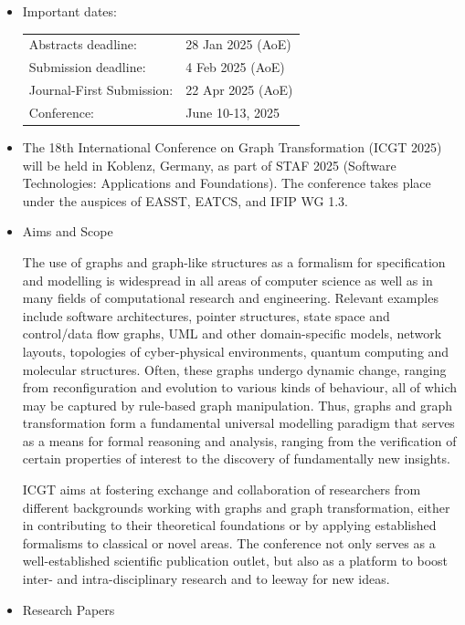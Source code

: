 \documentclass[prodmode,acmtecs]{acmsmall} %
\begin{document}
\begin{itemize}\item  Important dates:  
 
\begin{tabulary}{\linewidth}{LL}Abstracts deadline:  & 28 Jan 2025 (AoE) \\
Submission deadline:  & 4 Feb 2025 (AoE) \\
Journal-First Submission:  & 22 Apr 2025 (AoE) \\
Conference:  & June 10-13, 2025 \\
\end{tabulary}
 
\item  The 18th International Conference on Graph Transformation (ICGT 2025) will be held in Koblenz, Germany, as part of STAF 2025 (Software Technologies: Applications and Foundations). The conference takes place under the auspices of EASST, EATCS, and IFIP WG 1.3.  
 
\item  Aims and Scope 
 
  The use of graphs and graph-like structures as a formalism for specification and modelling is widespread in all areas of computer science as well as in many fields of computational research and engineering. Relevant examples include software architectures, pointer structures, state space and control/data flow graphs, UML and other domain-specific models, network layouts, topologies of cyber-physical environments, quantum computing and molecular structures. Often, these graphs undergo dynamic change, ranging from reconfiguration and evolution to various kinds of behaviour, all of which may be captured by rule-based graph manipulation. Thus, graphs and graph transformation form a fundamental universal modelling paradigm that serves as a means for formal reasoning and analysis, ranging from the verification of certain properties of interest to the discovery of fundamentally new insights. 
 
  ICGT aims at fostering exchange and collaboration of researchers from different backgrounds working with graphs and graph transformation, either in contributing to their theoretical foundations or by applying established formalisms to classical or novel areas. The conference not only serves as a well-established scientific publication outlet, but also as a platform to boost inter- and intra-disciplinary research and to leeway for new ideas. 
 
\item  Research Papers 
 

\end{itemize}
\end{document}

